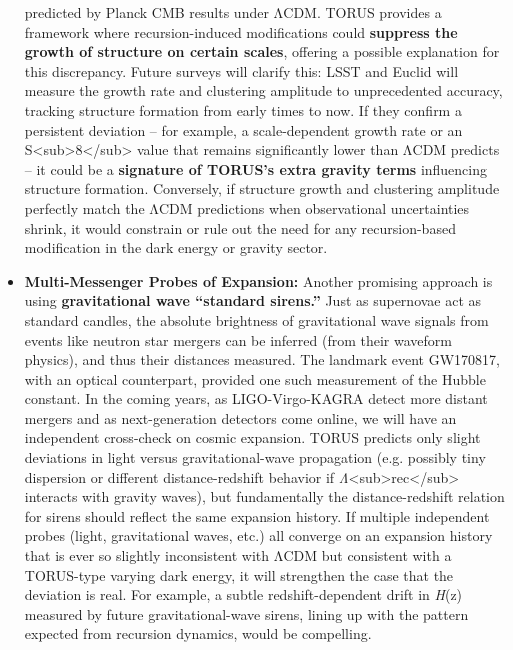 \begin{itemize}
  predicted by Planck CMB results under ΛCDM. TORUS provides a framework
  where recursion-induced modifications could \textbf{suppress the
  growth of structure on certain scales}, offering a possible
  explanation for this discrepancy​. Future surveys will clarify this:
  LSST and Euclid will measure the growth rate and clustering amplitude
  to unprecedented accuracy, tracking structure formation from early
  times to now. If they confirm a persistent deviation -- for example, a
  scale-dependent growth rate or an
  S\textless{}sub\textgreater{}8\textless{}/sub\textgreater{} value that
  remains significantly lower than ΛCDM predicts -- it could be a
  \textbf{signature of TORUS's extra gravity terms} influencing
  structure formation​. Conversely, if structure growth and clustering
  amplitude perfectly match the ΛCDM predictions when observational
  uncertainties shrink, it would constrain or rule out the need for any
  recursion-based modification in the dark energy or gravity sector.
\item
  \textbf{Multi-Messenger Probes of Expansion:} Another promising
  approach is using \textbf{gravitational wave ``standard sirens.''}
  Just as supernovae act as standard candles, the absolute brightness of
  gravitational wave signals from events like neutron star mergers can
  be inferred (from their waveform physics), and thus their distances
  measured. The landmark event GW170817, with an optical counterpart,
  provided one such measurement of the Hubble constant. In the coming
  years, as LIGO-Virgo-KAGRA detect more distant mergers and as
  next-generation detectors come online, we will have an independent
  cross-check on cosmic expansion. TORUS predicts only slight deviations
  in light versus gravitational-wave propagation (e.g. possibly tiny
  dispersion or different distance-redshift behavior if
  \emph{Λ}\textless{}sub\textgreater{}rec\textless{}/sub\textgreater{}
  interacts with gravity waves​), but fundamentally the
  distance-redshift relation for sirens should reflect the same
  expansion history. If multiple independent probes (light,
  gravitational waves, etc.) all converge on an expansion history that
  is ever so slightly inconsistent with ΛCDM but consistent with a
  TORUS-type varying dark energy, it will strengthen the case that the
  deviation is real. For example, a subtle redshift-dependent drift in
  \emph{H}(z) measured by future gravitational-wave sirens, lining up
  with the pattern expected from recursion dynamics, would be
  compelling.
\end{itemize}

